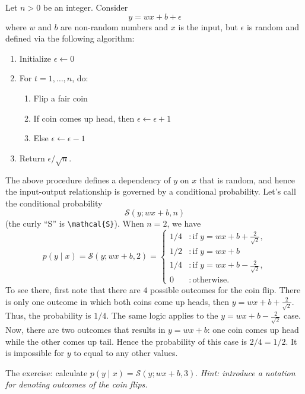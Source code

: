 \documentclass{article}
\begin{document}
Let \(n > 0\) be an integer.
Consider
\[y = wx+b + \epsilon\] where \(w\) and \(b\) are non-random numbers and \(x\) is the input, but \(\epsilon\) is random and defined via the following algorithm:
\begin{enumerate}
  \item Initialize \(\epsilon \gets 0\)

  \item For \(t = 1,\dots, n\), do:
        \begin{enumerate}[1.]
          \item Flip a fair coin

          \item If coin comes up head, then \(\epsilon \gets \epsilon + 1\)

          \item Else \(\epsilon \gets \epsilon - 1\)
        \end{enumerate}

  \item Return \(\epsilon/\sqrt{n}\).
\end{enumerate}
The above procedure defines a dependency of \(y\) on \(x\) that is random, and hence the input-output relationship is governed by a conditional probability.
Let's call the conditional probability
\[
  \mathcal{S}(y; wx+b, n)
\]
(the curly ``S'' is \verb|\mathcal{S}|).
When \(n=2\), we have
\[
  p(y\mid x) =
  \mathcal{S}(y; wx+b, 2)
  =
  \begin{cases}
    1/4
    &:
      \mbox{if }
      y =
   wx+b + \frac{2}{\sqrt{2}},
      \\
    1/2 &:
      \mbox{if }
          y = wx+b \\
    1/4
    &:
      \mbox{if }
      y=
   wx+b - \frac{2}{\sqrt{2}},
    \\
    0 &: \mbox{otherwise}.
  \end{cases}
\]
To see there, first note that there are \(4\) possible outcomes for the coin flip.
There is only one outcome in which both coins come up heads, then
\(
y=
   wx+b + \frac{2}{\sqrt{2}}
   \).
   Thus, the probability is \(1/4\). The same logic applies to
   the
\(
y=
   wx+b - \frac{2}{\sqrt{2}}
   \) case.
   Now, there are two outcomes that results in
   \(
    y = wx+b \): one coin comes up head while the other comes up tail. Hence the probability of this case is \(2/4 = 1/2\).
    It is impossible for \(y\) to equal to any other values.

    The exercise: calculate
\(  p(y\mid x) =
  \mathcal{S}(y; wx+b, 3)
\). \emph{Hint: introduce a notation for denoting outcomes of the coin flips.}
\end{document}
